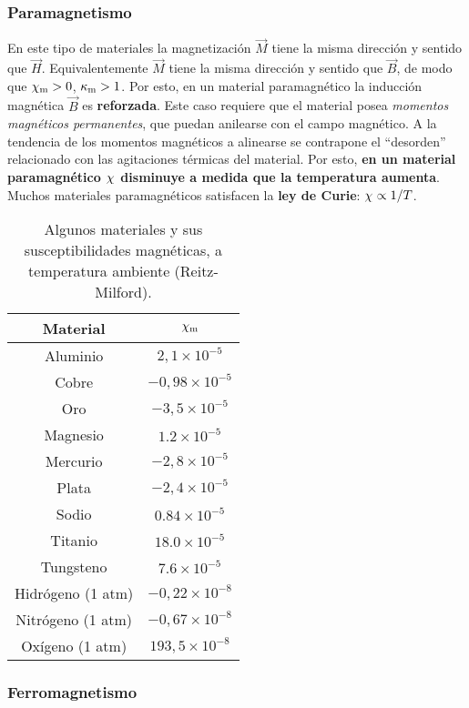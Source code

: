 \subsubsection{Paramagnetismo}
 En este tipo de materiales la magnetización $\vec{M}$
tiene la misma dirección y sentido que $\vec{H}$. Equivalentemente $\vec{M}$
tiene la misma dirección y sentido que $\vec{B}$, de modo que
$\chi_{\rm m}>0$, $\kappa_{\rm m}>1$. Por esto, en un material paramagnético la inducción magnética $\vec{B}$ es \textbf{reforzada}. Este caso requiere que el material posea \textit{momentos magnéticos permanentes}, que puedan anilearse con el campo magnético.
A la tendencia de los momentos magnéticos a alinearse se
contrapone el ``desorden'' relacionado con las agitaciones térmicas del
material. Por esto, \textbf{en un material paramagnético $\chi_{\rm}$ disminuye a
medida que la temperatura aumenta}. Muchos materiales paramagnéticos satisfacen
la \textbf{ley de Curie}: $\chi_{\rm}\propto 1/T$.
\begin{table}[h!]
\begin{center}
\begin{tabular}{c|c}
Material & $\chi_{\rm m}$ \\ \hline\hline
Aluminio & $2,1\times 10^{-5}$ \\
Cobre & $-0,98\times 10^{-5}$ \\
Oro & $-3,5\times 10^{-5}$ \\
Magnesio & $1.2\times 10^{-5}$ \\
Mercurio & $-2,8\times 10^{-5}$ \\
Plata & $-2,4\times 10^{-5}$ \\
Sodio & $0.84\times 10^{-5}$ \\
Titanio & $18.0\times 10^{-5}$ \\
Tungsteno & $7.6\times 10^{-5}$ \\
Hidrógeno (1 atm) & $-0,22\times 10^{-8}$ \\
Nitrógeno (1 atm) & $-0,67\times 10^{-8}$ \\
Oxígeno (1 atm) & $193,5\times 10^{-8}$
\end{tabular}
\caption{Algunos materiales y sus susceptibilidades magnéticas, a temperatura ambiente (Reitz-Milford).}
\end{center}
\end{table}

\subsubsection{Ferromagnetismo}

